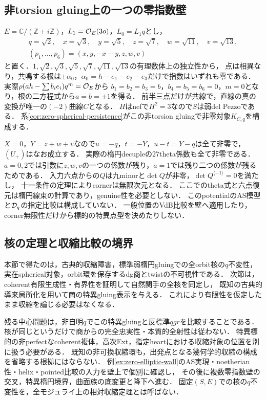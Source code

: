\subsection{非torsion gluing上の一つの零指数壁}
\begin{example}[単一の零根を持つ明示的な弱avatar]\label{ex:zero-elliptic-wall}
$E=\mathbb C/(\mathbb Z+i\mathbb Z)$，$L_1=\mathcal O_E(3o)$，$L_0=L_1q$とし，
\[
 \begin{gathered}
 q=\sqrt2,\quad x=\sqrt3,\quad y=\sqrt5,\quad z=\sqrt7,
 \quad w=\sqrt{11},\quad v=\sqrt{13},\\
 (p_1,\ldots,p_6)=(x,y,-x-y,z,w,v)
 \end{gathered}
\]
と置く．$1,\sqrt2,\sqrt3,\sqrt5,\sqrt7,\sqrt{11},\sqrt{13}$の有理数体上の独立性から，
点は相異なり，共鳴する根は$\pm\alpha_0$，$\alpha_0=h-e_1-e_2-e_3$だけで指数はいずれも零である．
実際$\rho(ah-\sum b_ie_i)q^m=\mathcal O_E$から
$b_1=b_2=b_3=b$，$b_4=b_5=b_6=0$，$m=0$となり，根の二方程式から$a=b=\pm1$を得る．
前半三点だけが共線で，直線の真の変換が唯一の$(-2)$曲線$C$となる．
$H$はnefで$H^2=3$なので$S$は弱del Pezzoである．
系\ref{cor:zero-spherical-persistence}がこの非torsion gluingで非零対象$K_{C,q}$を構成する．

$X=0$，$Y=z+w+v$なので$u=-q$，$t=-Y$，$u-t=Y-q$は全て非零で，$(U_+)$はなお成立する．
実際の楕円decupleの27theta係数も全て非零である．
$a=0,2$では引数に$z,w,v$の一つの係数が残り，$a=1$では残り二つの係数が残るためである．
入力六点からの$Q$は九minorと$\det Q$が非零，$\det Q^{\langle-1\rangle}=0$を満たし，
十一条件の定理によりcornerは無限次元となる．
ここでのtheta式と六点復元は楕円線束の計算であり，genuine性を必要としない．
このpotentialのAS模型と$\mathcal D_q$の指定比較は構成していない．
一般位置のVdB比較を壁へ適用したり，corner無限性だけから標的の特異点型を決めたりしない．
\end{example}

\subsection{核の定理と収縮比較の境界}\label{subsec:zero-wall-future}
本節で得たのは，古典的収縮障害，標準弱楕円gluingでの全orbit核の$q$不変性，
実在spherical対象，orbit環を保存するdg商とtwistの不可視性である．
次節は，coherent有限生成性・有界性を証明して自然関手の全核を同定し，
既知の古典的導来局所化を用いて商の特異gluing表示を与える．
これにより有限性を仮定したまま収縮を論じる必要はなくなる．

残る中心問題は，非自明$q$でこの特異gluingと反標準$qgr$を比較することである．
核が同じというだけで商からの完全忠実性・本質的全射性は従わない．
特異標的の非perfectなcoherent複体，高次Ext，指定heartにおける収縮対象の位置を別に扱う必要がある．
既知の非可換収縮環\cite{DonovanWemyssWalls}も，出発点となる幾何学的収縮の構成を省略する根拠にはならない．
例\ref{ex:zero-elliptic-wall}のAS実現・noetherian性・helix・pointed比較の入力を壁上で個別に確認し，
その後に複数零指数壁の交叉，特異楕円境界，曲面族の底変更と降下へ進む．
固定$(S,E)$での核の$q$不変性を，全モジュライ上の相対収縮定理とは呼ばない．
